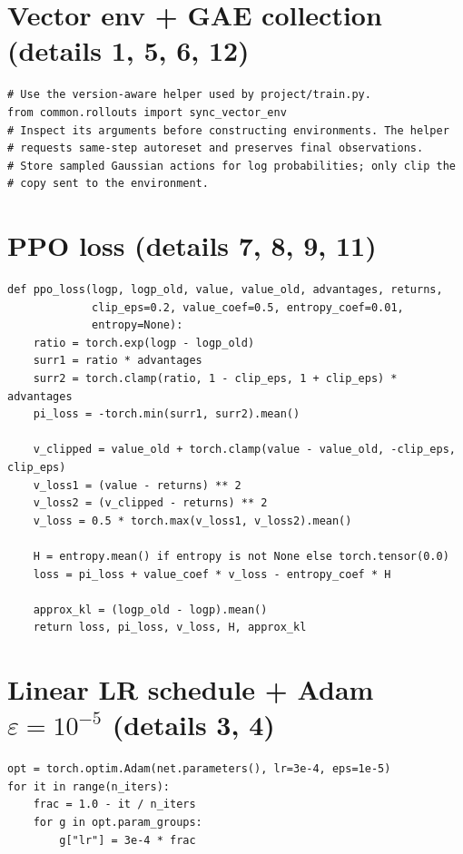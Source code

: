 \documentclass[11pt,oneside]{scrbook}
\begin{document}
\section{Vector env + GAE collection (details 1, 5, 6, 12)}

\begin{verbatim}
# Use the version-aware helper used by project/train.py.
from common.rollouts import sync_vector_env
# Inspect its arguments before constructing environments. The helper
# requests same-step autoreset and preserves final observations.
# Store sampled Gaussian actions for log probabilities; only clip the
# copy sent to the environment.

\end{verbatim}

\section{PPO loss (details 7, 8, 9, 11)}

\begin{verbatim}
def ppo_loss(logp, logp_old, value, value_old, advantages, returns,
             clip_eps=0.2, value_coef=0.5, entropy_coef=0.01,
             entropy=None):
    ratio = torch.exp(logp - logp_old)
    surr1 = ratio * advantages
    surr2 = torch.clamp(ratio, 1 - clip_eps, 1 + clip_eps) * advantages
    pi_loss = -torch.min(surr1, surr2).mean()

    v_clipped = value_old + torch.clamp(value - value_old, -clip_eps, clip_eps)
    v_loss1 = (value - returns) ** 2
    v_loss2 = (v_clipped - returns) ** 2
    v_loss = 0.5 * torch.max(v_loss1, v_loss2).mean()

    H = entropy.mean() if entropy is not None else torch.tensor(0.0)
    loss = pi_loss + value_coef * v_loss - entropy_coef * H

    approx_kl = (logp_old - logp).mean()
    return loss, pi_loss, v_loss, H, approx_kl
\end{verbatim}

\section{Linear LR schedule + Adam $\varepsilon=10^{-5}$ (details 3, 4)}

\begin{verbatim}
opt = torch.optim.Adam(net.parameters(), lr=3e-4, eps=1e-5)
for it in range(n_iters):
    frac = 1.0 - it / n_iters
    for g in opt.param_groups:
        g["lr"] = 3e-4 * frac
\end{verbatim}
\end{document}
